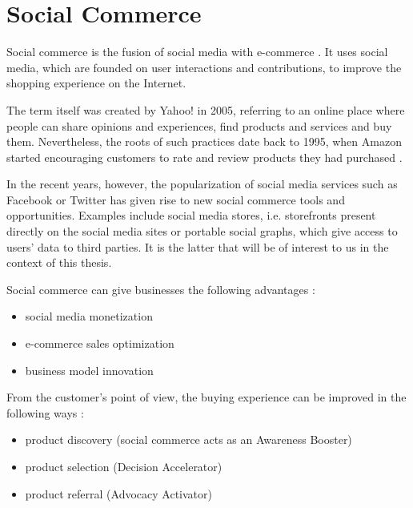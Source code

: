 \documentclass[12pt]{report}
\begin{document}
\section{Social Commerce}


Social commerce is the fusion of social media with e-commerce \cite{social_commerce_syzygy}. It uses social media, which are founded on user interactions and contributions, to improve the shopping experience on the Internet.

The term itself was created by Yahoo! in 2005, referring to an online place where people can share opinions and experiences, find products and services and buy them. Nevertheless, the roots of such practices date back to 1995, when Amazon started encouraging customers to rate and review products they had purchased \cite{social_commerce_syzygy}.

In the recent years, however, the popularization of social media services such as Facebook or Twitter has given rise to new social commerce tools and opportunities. Examples include social media stores, i.e. storefronts present directly on the social media sites or portable social graphs, which give access to users' data to third parties. It is the latter that will be of interest to us in the context of this thesis.


Social commerce can give businesses the following advantages \cite{social_commerce_syzygy}:
\begin{itemize}
\item social media monetization
\item e-commerce sales optimization
\item business model innovation
\end{itemize}

From the customer's point of view, the buying experience can be improved in the following ways \cite{social_commerce_syzygy}:
\begin{itemize}
\item product discovery (social commerce acts as an Awareness Booster)
\item product selection (Decision Accelerator)
\item product referral (Advocacy Activator)
\end{itemize}
\end{document}
